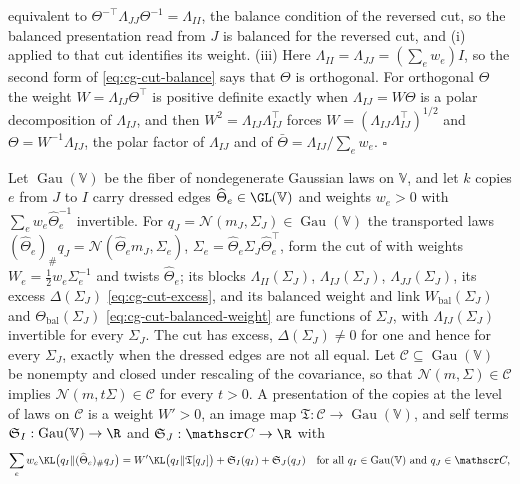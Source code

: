 equivalent to $\Theta^{-\top}\Lambda_{JJ}\Theta^{-1}=\Lambda_{II}$, the balance condition of the reversed cut,
so the balanced presentation read from $J$ is balanced for the reversed cut, and (i) applied to that cut
identifies its weight. (iii) Here $\Lambda_{II}=\Lambda_{JJ}=(\sum_ew_e)I$, so the second form of
\eqref{eq:cg-cut-balance} says that $\Theta$ is orthogonal. For orthogonal $\Theta$ the weight
$W=\Lambda_{IJ}\Theta^\top$ is positive definite exactly when $\Lambda_{IJ}=W\Theta$ is a polar decomposition
of $\Lambda_{IJ}$, and then $W^2=\Lambda_{IJ}\Lambda_{IJ}^\top$ forces $W=(\Lambda_{IJ}\Lambda_{IJ}^\top)^{1/2}$ and
$\Theta=W^{-1}\Lambda_{IJ}$, the polar factor of $\Lambda_{IJ}$ and of $\bar\Theta=\Lambda_{IJ}/\sum_ew_e$.
$\square$

Let $\operatorname{Gau}(\mathbb V)$ be the fiber of nondegenerate Gaussian laws on $\mathbb V$, and let $k$ copies $e$ from $J$ to
$I$ carry dressed edges $\widehat\Theta_e\in\GL(\mathbb V)$ and weights $w_e>0$ with $\sum_ew_e\widehat\Theta_e^{-1}$
invertible. For $q_J=\mathcal N(m_J,\Sigma_J)\in\operatorname{Gau}(\mathbb V)$ the transported laws
$(\widehat\Theta_e)_\#q_J=\mathcal N(\widehat\Theta_em_J,\Sigma_e)$, $\Sigma_e=\widehat\Theta_e\Sigma_J\widehat\Theta_e^\top$,
form the cut of  with weights $W_e=\tfrac12w_e\Sigma_e^{-1}$ and twists
$\widehat\Theta_e$; its blocks $\Lambda_{II}(\Sigma_J)$, $\Lambda_{IJ}(\Sigma_J)$, $\Lambda_{JJ}(\Sigma_J)$, its excess
$\Delta(\Sigma_J)$ \eqref{eq:cg-cut-excess}, and its balanced weight and link $W_{\mathrm{bal}}(\Sigma_J)$ and
$\Theta_{\mathrm{bal}}(\Sigma_J)$ \eqref{eq:cg-cut-balanced-weight} are functions of $\Sigma_J$, with
$\Lambda_{IJ}(\Sigma_J)$ invertible for every $\Sigma_J$. The cut has excess, $\Delta(\Sigma_J)\neq0$ for one and
hence for every $\Sigma_J$, exactly when the dressed edges are not all equal. Let $\mathscr C\subseteq\operatorname{Gau}(\mathbb V)$
be nonempty and closed under rescaling of the covariance, so that $\mathcal N(m,\Sigma)\in\mathscr C$ implies
$\mathcal N(m,t\Sigma)\in\mathscr C$ for every $t>0$. A presentation of the copies at the level of laws on
$\mathscr C$ is a weight $W'>0$, an image map $\mathfrak T:\mathscr C\to\operatorname{Gau}(\mathbb V)$, and self terms $\mathfrak S_I:\operatorname{Gau}(\mathbb V)\to\R$
and $\mathfrak S_J:\mathscr C\to\R$ with
\begin{equation}
\sum_ew_e\KL\bigl(q_I\Vert(\widehat\Theta_e)_\#q_J\bigr)=W'\KL\bigl(q_I\Vert \mathfrak T[q_J]\bigr)+\mathfrak S_I(q_I)+\mathfrak S_J(q_J)
\quad\text{for all }q_I\in\operatorname{Gau}(\mathbb V)\text{ and }q_J\in\mathscr C,
\label{eq:cg-cut-law-presentation}
\end{equation}
